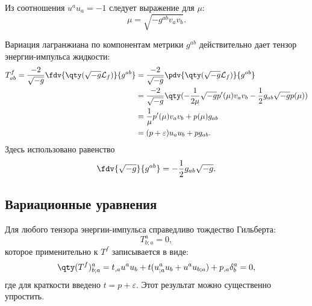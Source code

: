 \documentclass[\docroot/reports/draft/report.tex]{subfiles}
\begin{document}
    Из соотношения $u^a u_a = -1$ следует выражение для $\mu$:
    \begin{equation*}
        \mu = \sqrt{-g^{ab} v_a v_b} .
    \end{equation*}

    Вариация лагранжиана по компонентам метрики $g^{ab}$ действительно дает тензор энергии-импульса жидкости:
    \begin{equation}\begin{aligned}
        T^f_{ab} = \frac{-2}{\sqrt{-g}} \fdv{\qty(\sqrt{-g} \mathcal{L}_f)}{g^{ab}} &=
            \frac{-2}{\sqrt{-g}} \pdv{\qty(\sqrt{-g} \mathcal{L}_f)}{g^{ab}} \\ &=
            \frac{-2}{\sqrt{-g}} \qty(
                - \frac{1}{2 \mu} \sqrt{-g} p'(\mu) v_a v_b - \frac{1}{2} g_{ab} \sqrt{-g} p(\mu)
            ) \\ &=
            \frac{1}{\mu} p'(\mu) v_a v_b + p(\mu) g_{ab} \\ &=
            (p + \varepsilon) u_a u_b + p g_{ab} .
    \end{aligned}\end{equation}
    Здесь использовано равенство
    \begin{equation*}
        \fdv{\sqrt{-g}}{g^{ab}} = - \frac{1}{2} g_{ab} \sqrt{-g} .
    \end{equation*}

\subsection{Вариационные уравнения}

    Для любого тензора энергии-импульса справедливо тождество Гильберта:
    \begin{equation}
        T^a_{b;a} = 0 ,
    \end{equation}
    которое применительно к $T^f$ записывается в виде:
    \begin{equation*}
        \qty(T^f)^a_{b;a} = t_{,a} u^a u_b + t (u^a_{;a} u_b + u^a u_{b;a}) + p_{,a} \delta^a_b = 0,
    \end{equation*}
    где для краткости введено $t = p + \varepsilon$. Этот результат можно существенно упростить.
\end{document}
